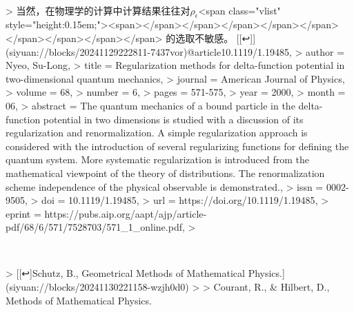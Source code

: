 \documentclass[lang=cn,10pt,newtx,bibend=biber,device=pad]{elegantbook}
\begin{document}
​

> 当然，在物理学的计算中计算结果往往对$\rho_\epsilon$<span class="vlist" style="height:0.15em;"><span></span></span></span></span></span></span></span></span>﻿</span> 的选取不敏感。 [[↩️]](siyuan://blocks/20241129222811-7437vor)@article{10.1119/1.19485,  
>     author = {Nyeo, Su-Long},  
>     title = {Regularization methods for delta-function potential in two-dimensional quantum mechanics},  
>     journal = {American Journal of Physics},  
>     volume = {68},  
>     number = {6},  
>     pages = {571-575},  
>     year = {2000},  
>     month = {06},  
>     abstract = {The quantum mechanics of a bound particle in the delta-function potential in two dimensions is studied with a discussion of its regularization and renormalization. A simple regularization approach is considered with the introduction of several regularizing functions for defining the quantum system. More systematic regularization is introduced from the mathematical viewpoint of the theory of distributions. The renormalization scheme independence of the physical observable is demonstrated.},  
>     issn = {0002-9505},  
>     doi = {10.1119/1.19485},  
>     url = {https://doi.org/10.1119/1.19485},  
>     eprint = {https://pubs.aip.org/aapt/ajp/article-pdf/68/6/571/7528703/571\_1\_online.pdf},  
> }

​

> [[↩️]Schutz, B., Geometrical Methods of Mathematical Physics.](siyuan://blocks/20241130221158-wzjh0d0)
>
> Courant, R., & Hilbert, D., Methods of Mathematical Physics.

​

‍
\end{document}
